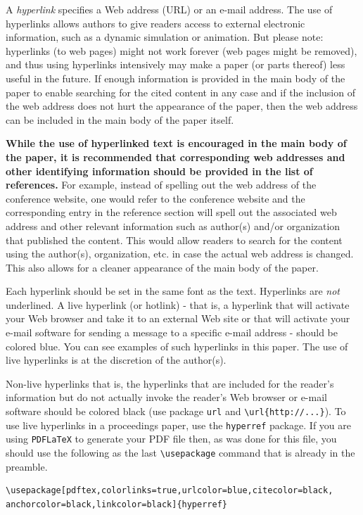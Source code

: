 \documentclass{scspaperproc}
\theoremstyle{scsthe}
\begin{document}
A \emph{hyperlink} specifies a Web address (URL) or an e-mail address. The use of hyperlinks allows authors to give readers access to external electronic information, such as a dynamic simulation or animation. 
But please note: hyperlinks (to web pages) might not work forever (web pages might be removed), and thus using hyperlinks intensively may make a paper (or parts thereof) less useful in the future. If enough information is provided in the main body of the paper to enable searching for the cited content in any case and if the inclusion of the web address does not hurt the appearance of the paper, then the web address can be included in the main body of the paper itself.

\textbf{While the use of hyperlinked text is encouraged in the main body of the paper, it is recommended that corresponding web addresses and other identifying information should be provided in the list of references.} For example, instead of spelling out the web address of the conference website, one would refer to the conference website and the corresponding entry in the reference section will spell out the associated web address and other relevant information such as author(s) and/or organization that published the content. This would allow readers to search for the content using the author(s), organization, etc. in case the actual web address is changed. This also allows for a cleaner appearance of the main body of the paper.

Each hyperlink should be set in the same font as the text. Hyperlinks are \emph{not} underlined. A live hyperlink (or hotlink) - that is, a hyperlink that will activate your Web browser and take it to an external Web site or that will activate your e-mail software for sending a message to a specific e-mail address - should be colored blue. You can see examples of such hyperlinks in this paper. The use of live hyperlinks is at the discretion of the author(s).

Non-live hyperlinks that is, the hyperlinks that are included for the reader’s information but do not actually invoke the reader’s Web browser or e-mail software should be colored black (use package \texttt{url} and \verb+\url{http://...}+). To use live hyperlinks in a proceedings paper, use the \texttt{hyperref} package. If you are using \texttt{PDFLaTeX} to generate your PDF file then, as was done for this file, you should use the following as the last \verb+\usepackage+ command that is already in the preamble.

\begin{verbatim}
\usepackage[pdftex,colorlinks=true,urlcolor=blue,citecolor=black,
anchorcolor=black,linkcolor=black]{hyperref}
\end{verbatim}
\end{document}
